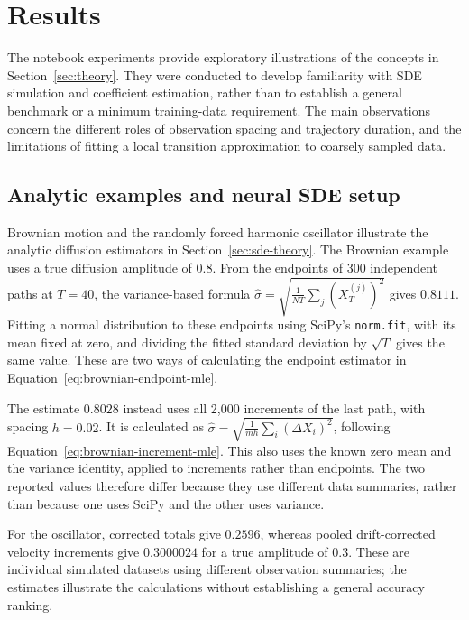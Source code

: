 \section{Results}
\label{sec:results}

The notebook experiments provide exploratory illustrations of the concepts in
Section~\ref{sec:theory}. They were conducted to develop familiarity with SDE
simulation and coefficient estimation, rather than to establish a general
benchmark or a minimum training-data requirement. The main observations concern
the different roles of observation spacing and trajectory duration, and the
limitations of fitting a local transition approximation to coarsely sampled data.

\subsection{Analytic examples and neural SDE setup}
\label{sec:analytic-results}

Brownian motion and the randomly forced harmonic oscillator illustrate the
analytic diffusion estimators in Section~\ref{sec:sde-theory}. The Brownian
example uses a true diffusion amplitude of $0.8$. From the endpoints of 300
independent paths at $T=40$, the variance-based formula
$\widehat{\sigma}=\sqrt{\frac{1}{NT}\sum_j(X_T^{(j)})^2}$ gives $0.8111$.
Fitting a normal distribution to these endpoints using SciPy's
\texttt{norm.fit}, with its mean fixed at zero, and dividing the fitted
standard deviation by $\sqrt{T}$ gives the same value. These are two ways of
calculating the endpoint estimator in
Equation~\eqref{eq:brownian-endpoint-mle}.

The estimate $0.8028$ instead uses all 2,000 increments of the last path,
with spacing $h=0.02$. It is calculated as
$\widehat{\sigma}=\sqrt{\frac{1}{mh}\sum_i(\Delta X_i)^2}$, following
Equation~\eqref{eq:brownian-increment-mle}. This also uses the known zero
mean and the variance identity, applied to increments rather than endpoints.
The two reported values therefore differ because they use different data
summaries, rather than because one uses SciPy and the other uses variance.

For the oscillator, corrected totals give
$0.2596$, whereas pooled drift-corrected velocity increments give $0.3000024$
for a true amplitude of $0.3$. These are individual simulated datasets using
different observation summaries; the estimates illustrate the calculations
without establishing a general accuracy ranking.

